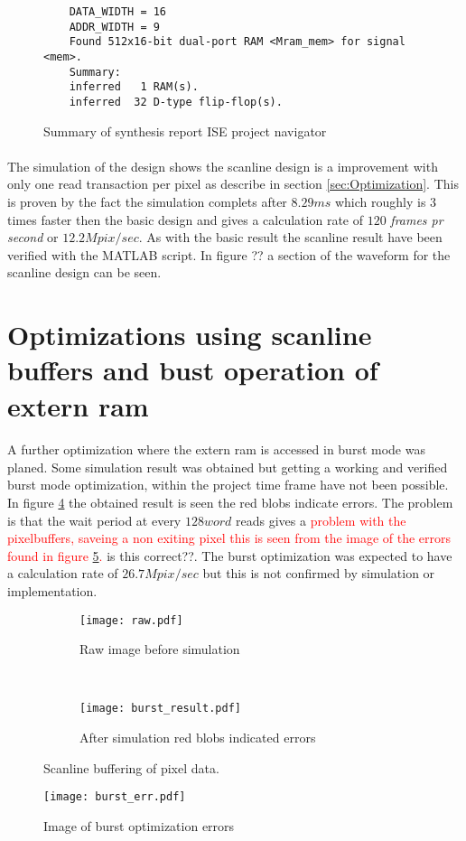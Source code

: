 \begin{figure}[H]
\centering
\begin{BVerbatim}
    DATA_WIDTH = 16
    ADDR_WIDTH = 9
    Found 512x16-bit dual-port RAM <Mram_mem> for signal <mem>.
    Summary:
	inferred   1 RAM(s).
	inferred  32 D-type flip-flop(s).
\end{BVerbatim}
\caption{Summary of synthesis report ISE project navigator}
\label{fig:sum_synthesis_report_ram}
\end{figure}

\paragraph*{}
The simulation of the design shows the scanline design is a improvement with only one read transaction per pixel as describe in section \ref{sec:Optimization}. This is proven by the fact the simulation complets after $8.29ms$ which roughly is 3 times faster then the basic design and gives a calculation rate of $120$ \textit{frames pr second} or $12.2Mpix/sec$. As with the basic result the scanline result have been verified with the MATLAB script. In figure ?? a section of the waveform  for the scanline design can be seen.

\section{Optimizations using scanline buffers and bust operation of extern ram}
\paragraph*{}
A further optimization where the extern ram is accessed in burst mode was planed. Some simulation result was obtained but getting a working and verified burst mode optimization, within the project time frame have not been possible. In figure \ref{fig:burst_picture} the obtained result is seen the red blobs indicate errors. The problem is that the wait period at every $128word$ reads gives a \textcolor{red}{problem with the pixelbuffers, saveing a non exiting pixel this is seen from the image of the errors found in figure \ref{fig:pic_burst_err}.} is this correct??. The burst optimization was expected to have a calculation rate of $26.7Mpix/sec$ but this is not confirmed by simulation or implementation.
     
\begin{figure}[H]
	\centering
	\begin{subfigure}[b]{0.5\textwidth}
		\texttt{[image: raw.pdf]}
		\caption{Raw image before simulation}
		\label{fig:raw_burst}
    \end{subfigure}%
        ~ %
    \begin{subfigure}[b]{0.5\textwidth}
    	\texttt{[image: burst\_result.pdf]}
    	\caption{After simulation red blobs indicated errors}
    	\label{fig:burst_picture_sobel}
	\end{subfigure}
	\caption{Scanline buffering of pixel data.}
    	\label{fig:burst_picture}
\end{figure}


\begin{figure}[H]
	\centering
	\texttt{[image: burst\_err.pdf]}
	\caption{Image of burst optimization errors}
	\label{fig:pic_burst_err}
\end{figure}